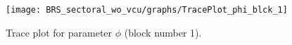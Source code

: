 \begin{figure}[H]
\centering
  \texttt{[image: BRS\_sectoral\_wo\_vcu/graphs/TracePlot\_phi\_blck\_1]}\\
    \caption{Trace plot for parameter ${\phi}$ (block number 1).}
\end{figure}
